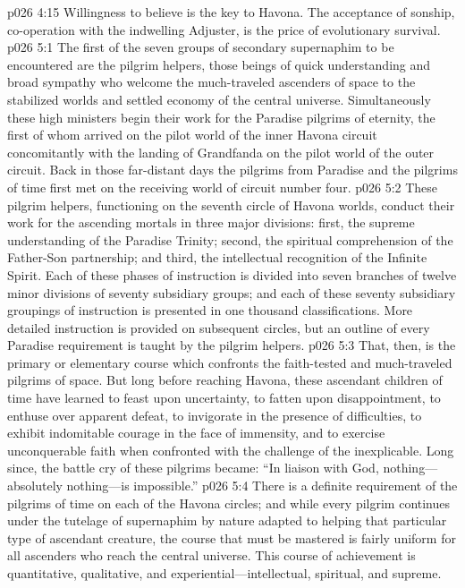 \vs p026 4:15  Willingness to believe is the key to Havona. The acceptance of sonship, co\hyp{}operation with the indwelling Adjuster, is the price of evolutionary survival.
%
\vs p026 5:1 The first of the seven groups of secondary supernaphim to be encountered are the pilgrim helpers, those beings of quick understanding and broad sympathy who welcome the much\hyp{}traveled ascenders of space to the stabilized worlds and settled economy of the central universe. Simultaneously these high ministers begin their work for the Paradise pilgrims of eternity, the first of whom arrived on the pilot world of the inner Havona circuit concomitantly with the landing of Grandfanda on the pilot world of the outer circuit. Back in those far\hyp{}distant days the pilgrims from Paradise and the pilgrims of time first met on the receiving world of circuit number four.
\vs p026 5:2 These pilgrim helpers, functioning on the seventh circle of Havona worlds, conduct their work for the ascending mortals in three major divisions: first, the supreme understanding of the Paradise Trinity; second, the spiritual comprehension of the Father\hyp{}Son partnership; and third, the intellectual recognition of the Infinite Spirit. Each of these phases of instruction is divided into seven branches of twelve minor divisions of seventy subsidiary groups; and each of these seventy subsidiary groupings of instruction is presented in one thousand classifications. More detailed instruction is provided on subsequent circles, but an outline of every Paradise requirement is taught by the pilgrim helpers.\plusone
\vs p026 5:3 That, then, is the primary or elementary course which confronts the faith\hyp{}tested and much\hyp{}traveled pilgrims of space. But long before reaching Havona, these ascendant children of time have learned to feast upon uncertainty, to fatten upon disappointment, to enthuse over apparent defeat, to invigorate in the presence of difficulties, to exhibit indomitable courage in the face of immensity, and to exercise unconquerable faith when confronted with the challenge of the inexplicable. Long since, the battle cry of these pilgrims became: “In liaison with God, nothing---absolutely nothing---is impossible.”
\vs p026 5:4 There is a definite requirement of the pilgrims of time on each of the Havona circles; and while every pilgrim continues under the tutelage of supernaphim by nature adapted to helping that particular type of ascendant creature, the course that must be mastered is fairly uniform for all ascenders who reach the central universe. This course of achievement is quantitative, qualitative, and experiential---intellectual, spiritual, and supreme.
